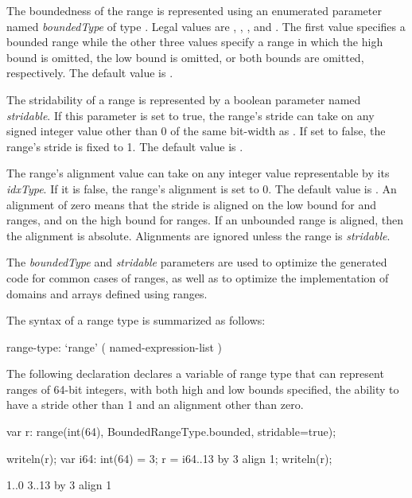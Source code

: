 The boundedness of the range is represented using an enumerated
parameter named \emph{boundedType} of type .
Legal values are , ,
, and .  The first value specifies
a bounded range while the other three values specify a range in which
the high bound is omitted, the low bound is omitted, or both bounds
are omitted, respectively.  The default value is .

The stridability of a range is represented by a boolean parameter
named \emph{stridable}.  If this parameter is set to true, the range's
stride can take on any signed integer value other than 0 of the same
bit-width as .  If set to false, the range's stride is
fixed to 1.  The default value is .

The range's alignment
value can take on any integer value representable by its \emph{idxType}.  If it
is false, the range's alignment is set to 0.  The default value is .
An alignment of zero means that the stride is aligned on the low bound
for  and  ranges, and on the high bound
for  ranges.  If an unbounded range is aligned, then the
alignment is absolute.  Alignments are ignored unless the range is \emph{stridable}.

\begin{rationale}
The \emph{boundedType} and \emph{stridable} parameters are used
to optimize the generated code for common cases of ranges, as well as
to optimize the implementation of domains and arrays defined using ranges.
\end{rationale}

The syntax of a range type is summarized as follows:
\begin{syntax}
range-type:
  `range' ( named-expression-list )
\end{syntax}

\begin{example}
The following declaration declares a variable 
of range type that can represent ranges of 64-bit integers, with both
high and low bounds specified, the ability to have a stride other
than 1 and an alignment other than zero.
\begin{chapelpre}
\end{chapelpre}
\begin{chapel}
var r: range(int(64), BoundedRangeType.bounded, stridable=true);
\end{chapel}
\begin{chapelpost}
writeln(r);
var i64: int(64) = 3;
r = i64..13 by 3 align 1;
writeln(r);
\end{chapelpost}
\begin{chapeloutput}
1..0
3..13 by 3 align 1
\end{chapeloutput}
\end{example}

